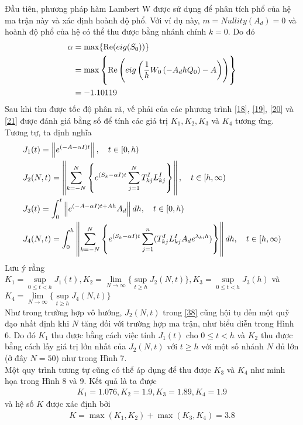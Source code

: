 \begin{vd}
\begin{figure}[h!]
	\label{fig:hinh-19}
\end{figure}
Đầu tiên, phương pháp hàm Lambert W được sử dụng để phân tích phổ của hệ ma trận này và xác định hoành độ phổ. Với ví dụ này, $m = Nullity(A_d) =0$ và hoành độ phổ của hệ có thể thu được bằng nhánh chính $k =0$. Do đó
\begin{align}\label{46}
	\alpha &= \max \{ \mathrm{Re}(eig(S_0))\} \notag\\
	& = \max\left\{\mathrm{Re} \left(eig \left(\dfrac{1}{h} W_0\left( -A_dhQ_0\right) - A\right) \right) \right\}	\notag \\
	& = -1.10119	
\end{align}
Sau khi thu được tốc độ phân rã, vế phải của các phương trình \eqref{18}, \eqref{19}, \eqref{20} và \eqref{21} được đánh giá bằng số để tính các giá trị $K_1, K_2, K_3$ và $K_4$ tương ứng. Tương tự, ta định nghĩa
\begin{align}
	&J_1(t) = \left \Vert e^{(-A-\alpha I)t} \right\Vert, \quad t \in [0,h)\\
	&J_2(N, t) = \left\Vert \sum_{k=-N}^N\left\{e^{(S_k-\alpha I)t} \sum_{j=1}^N T^I_{kj}L^I_{kj} \right\} \right\Vert, \quad t \in [h, \infty)\\
	&J_3(t) = \int_0^t\left\Vert e^{(-A-\alpha I)t+Ah }A_d\right\Vert dh , \quad t \in [0,h)\\
	&J_4(N,t)= \int^h_0 \left\Vert \sum_{k=-N}^N \left\{e^{(S_k-\alpha I)t} \sum_{j =1}^n(T^I_{kj}L^I_{kj}A_de^{\lambda_{ki}h })\right\}\right\Vert dh , \quad t \in [h, \infty)
 \end{align}
Lưu ý rằng $K_1 =\sup\limits_{0 \le t <h}J_1(t), K_2 = \lim\limits_{N\to \infty} \{\sup\limits_{t \ge h}J_2(N,t)\}, K_3 = \sup\limits_{0 \le t <h}J_3(h)$ và $K_4 = \lim\limits_{N\to \infty} \{\sup\limits_{t \ge h}J_4(N,t)\}$\\
Như trong trường hợp vô hướng, $J_2(N,t)$ trong \eqref{38} cũng hội tụ  đến một quỹ đạo nhất định khi $N$ tăng đối với trường hợp ma trận, như biểu diễn trong Hình 6. Do đó $K_1$ thu được bằng cách việc tính $J_1(t)$ cho $0 \le t<h$ và $K_2$ thu được bằng cách lấy giá trị lớn nhất của $J_2(N,t)$ với $t \ge h$ với một số nhánh $N$ đủ lớn (ở đây $N = 50$) như trong Hình 7.\\
Một quy trình tương tự cũng có thể áp dụng để thu được $K_3$ và $K_4$ như minh họa trong Hình 8 và 9. Kết quả là ta được
\begin{align*}
	K_1 = 1.076, K_2 = 1.9, K_3 = 1.89, K_4 = 1.9
\end{align*}
và hệ số $K$ được xác định bởi 
\begin{align*}
	K = \max(K_1, K_2) + \max(K_3, K_4) = 3.8

\end{align*}
\end{vd}
